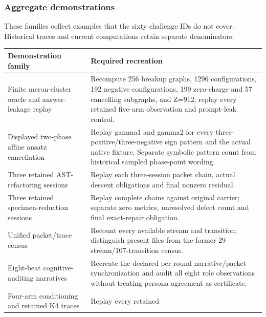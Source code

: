 \documentclass[
  11pt,
]{article}
\begin{document}
\subsubsection{Aggregate demonstrations}\label{aggregate-demonstrations}

These families collect examples that the sixty challenge IDs do not
cover. Historical traces and current computations retain separate
denominators.

\begin{longtable}[]{@{}
  >{\raggedright\arraybackslash}p{}
  >{\raggedright\arraybackslash}p{}@{}}
\toprule\noalign{}
\begin{minipage}[b]{\linewidth}\raggedright
Demonstration family
\end{minipage} & \begin{minipage}[b]{\linewidth}\raggedright
Required recreation
\end{minipage} \\
\midrule\noalign{}
\endhead
\bottomrule\noalign{}
\endlastfoot
Finite meron-cluster oracle and answer-leakage replay & Recompute 256
breakup graphs, 1296 configurations, 192 negative configurations, 199
zero-charge and 57 cancelling subgraphs, and Z=912; replay every
retained five-arm observation and prompt-leak control. \\
Displayed two-phase affine ansatz cancellation & Replay gamma1 and
gamma2 for every three-positive/three-negative sign pattern and the
actual native fixture. Separate symbolic pattern count from historical
sampled phase-point wording. \\
Three retained AST-refactoring sessions & Replay each three-session
packet chain, actual descent obligations and final nonzero residual. \\
Three retained specimen-reduction sessions & Replay complete chains
against original carrier; separate zero metrics, unresolved defect count
and final exact-repair obligation. \\
Unified packet/trace census & Recount every available stream and
transition; distinguish present files from the former
29-stream/107-transition census. \\
Eight-beat cognitive-auditing narratives & Recreate the declared
per-round narrative/packet synchronization and audit all eight role
observations without treating persona agreement as certificate. \\
Four-arm conditioning and retained K4 traces & Replay every retained

\end{longtable}
\end{document}

